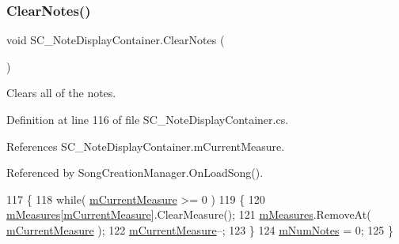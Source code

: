 \mbox{\label{group___s_c___n_d_c_pub_func_gaa344983500e83531210ae1c4789182f3}} 
\subsubsection{\texorpdfstring{Clear\+Notes()}{ClearNotes()}}
{\footnotesize\ttfamily void S\+C\+\_\+\+Note\+Display\+Container.\+Clear\+Notes (\begin{DoxyParamCaption}{ }\end{DoxyParamCaption})}



Clears all of the notes. 



Definition at line 116 of file S\+C\+\_\+\+Note\+Display\+Container.\+cs.



References S\+C\+\_\+\+Note\+Display\+Container.\+m\+Current\+Measure.



Referenced by Song\+Creation\+Manager.\+On\+Load\+Song().


\begin{DoxyCode}
117     \{
118         \textcolor{keywordflow}{while}( \hyperlink{group___s_c___n_d_c_priv_var_ga28ce2bf8358c9f686b5b9e362aa96dff}{mCurrentMeasure} >= 0 )
119         \{
120             \hyperlink{group___s_c___n_d_c_priv_var_gaa072fb53f6bd6646bc85f2ebc2a02229}{mMeasures}[\hyperlink{group___s_c___n_d_c_priv_var_ga28ce2bf8358c9f686b5b9e362aa96dff}{mCurrentMeasure}].ClearMeasure();
121             \hyperlink{group___s_c___n_d_c_priv_var_gaa072fb53f6bd6646bc85f2ebc2a02229}{mMeasures}.RemoveAt( \hyperlink{group___s_c___n_d_c_priv_var_ga28ce2bf8358c9f686b5b9e362aa96dff}{mCurrentMeasure} );
122             \hyperlink{group___s_c___n_d_c_priv_var_ga28ce2bf8358c9f686b5b9e362aa96dff}{mCurrentMeasure}--;
123         \}
124         \hyperlink{group___s_c___n_d_c_priv_var_gae06a4919a63806ed57b2040f41b7ca1b}{mNumNotes} = 0;
125     \}
\end{DoxyCode}
\mbox{\label{group___s_c___n_d_c_pub_func_ga526a610a4462b164cc91ae7155803ba1}} 
